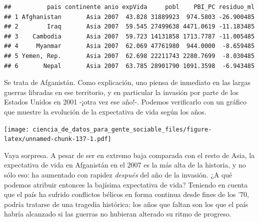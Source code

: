 \documentclass[spanish,]{book}
\newenvironment{Shaded}{\begin{snugshade}}{\end{snugshade}}
\newcommand{\DataTypeTok}[1]{\textcolor[rgb]{0.13,0.29,0.53}{#1}}
\newcommand{\KeywordTok}[1]{\textcolor[rgb]{0.13,0.29,0.53}{\textbf{#1}}}
\newcommand{\NormalTok}[1]{#1}
\newcommand{\OperatorTok}[1]{\textcolor[rgb]{0.81,0.36,0.00}{\textbf{#1}}}
\newcommand{\StringTok}[1]{\textcolor[rgb]{0.31,0.60,0.02}{#1}}
\begin{document}
\begin{verbatim}
##          pais continente anio expVida     pobl    PBI_PC residuo_ml
## 1 Afghanistan       Asia 2007  43.828 31889923  974.5803 -26.900485
## 2        Iraq       Asia 2007  59.545 27499638 4471.0619 -11.183485
## 3    Cambodia       Asia 2007  59.723 14131858 1713.7787 -11.005485
## 4     Myanmar       Asia 2007  62.069 47761980  944.0000  -8.659485
## 5 Yemen, Rep.       Asia 2007  62.698 22211743 2280.7699  -8.030485
## 6       Nepal       Asia 2007  63.785 28901790 1091.3598  -6.943485
\end{verbatim}

Se trata de Afganistán. Como explicación, uno piensa de inmediato en las largas guerras libradas en ese territorio, y en particular la invasión por parte de los Estados Unidos en 2001 -¡otra vez ese año!-. Podemos verificarlo con un gráfico que muestre la evolución de la expectativa de vida según los años.

\begin{Shaded}
\end{Shaded}

\texttt{[image: ciencia\_de\_datos\_para\_gente\_sociable\_files/figure-latex/unnamed-chunk-137-1.pdf]}

Vaya sorpresa. A pesar de ser en extremo baja comparada con el resto de Asia, la expectativa de vida en Afganistán en el 2007 es la más alta de la historia, y no sólo eso: ha aumentado con rapidez \emph{después} del año de la invasión. ¿A qué podemos atribuir entonces la bajísima expectativa de vida? Teniendo en cuenta que el país ha sufrido conflictos bélicos en forma continua desde fines de los '70, podría tratarse de una tragedia histórica: los años que faltan son los que el país habría alcanzado si las guerras no hubieran alterado su ritmo de progreso.
\end{document}
